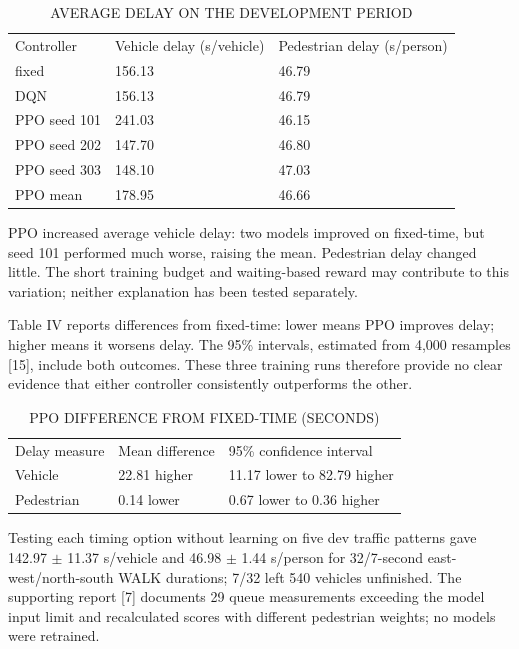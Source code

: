\documentclass[conference]{IEEEtran}
\begin{document}
\begin{table}[ht]\centering\footnotesize
\caption{AVERAGE DELAY ON THE DEVELOPMENT PERIOD}
\setlength{\tabcolsep}{2pt}\begin{tabular}{p{68pt}p{86pt}p{86pt}}\hline
Controller & Vehicle delay (s/vehicle) & Pedestrian delay (s/person) \\
fixed & 156.13 & 46.79 \\
DQN & 156.13 & 46.79 \\
PPO seed 101 & 241.03 & 46.15 \\
PPO seed 202 & 147.70 & 46.80 \\
PPO seed 303 & 148.10 & 47.03 \\
PPO mean & 178.95 & 46.66 \\
\hline\end{tabular}\end{table}
PPO increased average vehicle delay: two models improved on fixed-time, but seed 101 performed much worse, raising the mean. Pedestrian delay changed little. The short training budget and waiting-based reward may contribute to this variation; neither explanation has been tested separately.

Table IV reports differences from fixed-time: lower means PPO improves delay; higher means it worsens delay. The 95\% intervals, estimated from 4,000 resamples [15], include both outcomes. These three training runs therefore provide no clear evidence that either controller consistently outperforms the other.

\begin{table}[ht]\centering\footnotesize
\caption{PPO DIFFERENCE FROM FIXED-TIME (SECONDS)}
\setlength{\tabcolsep}{2pt}\begin{tabular}{p{68pt}p{68pt}p{104pt}}\hline
Delay measure & Mean difference & 95\% confidence interval \\
Vehicle & 22.81 higher & 11.17 lower to 82.79 higher \\
Pedestrian & 0.14 lower & 0.67 lower to 0.36 higher \\
\hline\end{tabular}\end{table}
Testing each timing option without learning on five dev traffic patterns gave 142.97 $\pm$ 11.37 s/vehicle and 46.98 $\pm$ 1.44 s/person for 32/7-second east-west/north-south WALK durations; 7/32 left 540 vehicles unfinished. The supporting report [7] documents 29 queue measurements exceeding the model input limit and recalculated scores with different pedestrian weights; no models were retrained.
\end{document}
